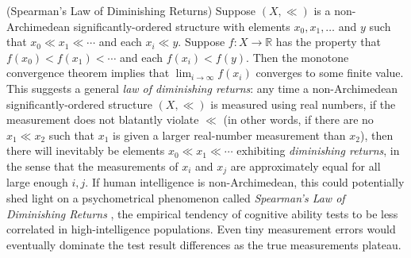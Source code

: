 \documentclass[twoside,11pt]{article}
\begin{document}
\begin{remark}
(Spearman's Law of Diminishing Returns)
Suppose $(X,\ll)$ is a non-Archimedean significantly-ordered structure
with elements $x_0,x_1,\ldots$ and $y$ such that
$x_0\ll x_1\ll\cdots$ and each $x_i\ll y$.
Suppose $f:X\to\mathbb R$ has the property that $f(x_0)<f(x_1)<\cdots$
and each $f(x_i)<f(y)$. Then the monotone convergence theorem implies
that $\lim_{i\to\infty}f(x_i)$ converges to some finite value.
This suggests a general \emph{law
of diminishing returns}: any time a non-Archimedean significantly-ordered
structure $(X,\ll)$ is measured using
real numbers, if the measurement does not blatantly violate $\ll$ (in other
words, if there are no $x_1\ll x_2$ such that $x_1$ is given a larger real-number
measurement than $x_2$), then there will inevitably be elements $x_0\ll x_1\ll \cdots$
exhibiting \emph{diminishing returns}, in the sense that the measurements of
$x_i$ and $x_j$ are approximately equal for all large enough $i,j$.
If human intelligence is non-Archimedean, this could potentially shed light on
a psychometrical phenomenon called \emph{Spearman's Law of Diminishing Returns}
\citep{spearman1927abilities, blum2017spearman, hernandez2019ai}, the empirical
tendency of cognitive ability tests to be less correlated in
high-intelligence populations. Even tiny measurement errors would eventually
dominate the test result differences as the true measurements plateau.
\end{remark}
\end{document}
